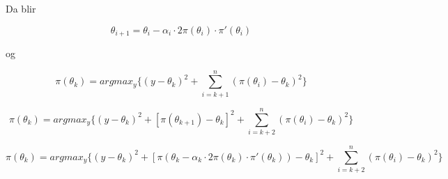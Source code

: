 \documentclass[11pt]{article}
\begin{document}
Da blir

\[\theta_{i+1} = \theta_i - \alpha_i \cdot 2\pi(\theta_i) \cdot \pi'(\theta_i)\]

og

\[
    \pi(\theta_k) = argmax_{y} \{(y - \theta_k)^2 + \sum_{i=k+1}^{n} (\pi(\theta_i) - \theta_k)^2\}
\]

\[
    \pi(\theta_k) = argmax_{y} \{(y - \theta_k)^2 + [\pi(\theta_{k+1}) - \theta_k]^2 + \sum_{i=k+2}^{n} (\pi(\theta_i) - \theta_k)^2\}
\]

\[
    \pi(\theta_k) = argmax_{y} \{(y - \theta_k)^2 + [\pi(\theta_k - \alpha_k \cdot 2\pi(\theta_k) \cdot \pi'(\theta_k)) - \theta_k]^2 + \sum_{i=k+2}^{n} (\pi(\theta_i) - \theta_k)^2\}
\]
\end{document}
